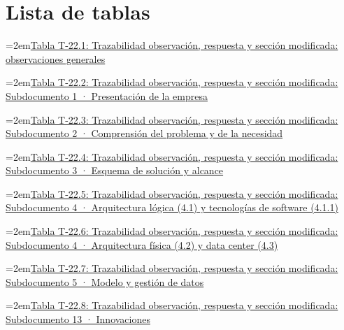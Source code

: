 \documentclass[11pt]{article}
\begin{document}
\tableofcontents
\clearpage
\renewcommand{\thetable}{T-22.\arabic{table}}
\section*{Lista de tablas}

\noindent\hangindent=2em\hyperref[tab:t22-1]{Tabla T-22.1: Trazabilidad observación, respuesta y sección modificada: observaciones generales}\dotfill\pageref{tab:t22-1}\par\vspace{0.4\baselineskip}
\noindent\hangindent=2em\hyperref[tab:t22-2]{Tabla T-22.2: Trazabilidad observación, respuesta y sección modificada: Subdocumento 1 · Presentación de la empresa}\dotfill\pageref{tab:t22-2}\par\vspace{0.4\baselineskip}
\noindent\hangindent=2em\hyperref[tab:t22-3]{Tabla T-22.3: Trazabilidad observación, respuesta y sección modificada: Subdocumento 2 · Comprensión del problema y de la necesidad}\dotfill\pageref{tab:t22-3}\par\vspace{0.4\baselineskip}
\noindent\hangindent=2em\hyperref[tab:t22-4]{Tabla T-22.4: Trazabilidad observación, respuesta y sección modificada: Subdocumento 3 · Esquema de solución y alcance}\dotfill\pageref{tab:t22-4}\par\vspace{0.4\baselineskip}
\noindent\hangindent=2em\hyperref[tab:t22-5]{Tabla T-22.5: Trazabilidad observación, respuesta y sección modificada: Subdocumento 4 · Arquitectura lógica (4.1) y tecnologías de software (4.1.1)}\dotfill\pageref{tab:t22-5}\par\vspace{0.4\baselineskip}
\noindent\hangindent=2em\hyperref[tab:t22-6]{Tabla T-22.6: Trazabilidad observación, respuesta y sección modificada: Subdocumento 4 · Arquitectura física (4.2) y data center (4.3)}\dotfill\pageref{tab:t22-6}\par\vspace{0.4\baselineskip}
\noindent\hangindent=2em\hyperref[tab:t22-7]{Tabla T-22.7: Trazabilidad observación, respuesta y sección modificada: Subdocumento 5 · Modelo y gestión de datos}\dotfill\pageref{tab:t22-7}\par\vspace{0.4\baselineskip}
\noindent\hangindent=2em\hyperref[tab:t22-8]{Tabla T-22.8: Trazabilidad observación, respuesta y sección modificada: Subdocumento 13 · Innovaciones}\dotfill\pageref{tab:t22-8}\par\vspace{0.4\baselineskip}
\clearpage
\end{document}
